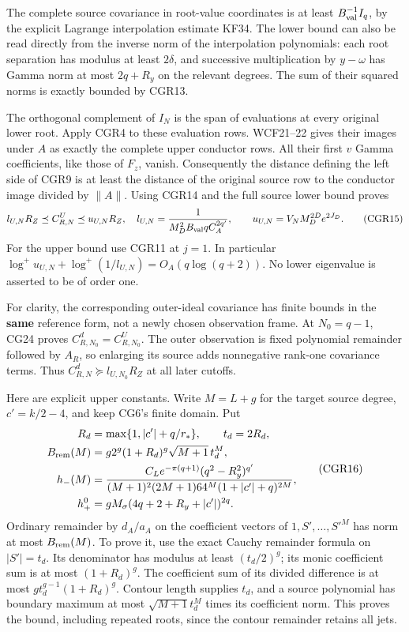 \documentclass[11pt]{article}
\begin{document}
The complete source covariance in root-value coordinates is at least \(B_{\rm val}^{-1}I_q\), by the explicit Lagrange interpolation estimate KF34. The lower bound can also be read directly from the inverse norm of the interpolation polynomials: each root separation has modulus at least \(2\delta\), and successive multiplication by \(y-\omega\) has Gamma norm at most \(2q+R_y\) on the relevant degrees. The sum of their squared norms is exactly bounded by CGR13.

The orthogonal complement of \(I_N\) is the span of evaluations at every original lower root. Apply CGR4 to these evaluation rows. WCF21--22 gives their images under \(A\) as exactly the complete upper conductor rows. All their first \(v\) Gamma coefficients, like those of \(F_z\), vanish. Consequently the distance defining the left side of CGR9 is at least the distance of the original source row to the conductor image divided by \(\|A\|\). Using CGR14 and the full source lower bound proves \[
l_{U,N}R_Z\preceq C_{R,N}^U\preceq u_{U,N}R_Z,
\quad
l_{U,N}=\frac1{M_D^2 B_{\rm val}q C_A^{2q'}},\qquad
u_{U,N}=V_N M_D^{2D}e^{2J_D}.
\tag{CGR15}
\] For the upper bound use CGR11 at \(j=1\). In particular \(\log^+u_{U,N}+\log^+(1/l_{U,N})=O_A(q\log(q+2))\). No lower eigenvalue is asserted to be of order one.

For clarity, the corresponding outer-ideal covariance has finite bounds in the \textbf{same} reference form, not a newly chosen observation frame. At \(N_0=q-1\), CG24 proves \(C_{R,N_0}^d=C_{R,N_0}^U\). The outer observation is fixed polynomial remainder followed by \(A_R\), so enlarging its source adds nonnegative rank-one covariance terms. Thus \(C_{R,N}^d\succeq l_{U,N_0}R_Z\) at all later cutoffs.

Here are explicit upper constants. Write \(M=L+g\) for the target source degree, \(c'=k/2-4\), and keep CG6's finite domain. Put \[
\begin{split}
R_d&=\max\{1,|c'|+q/r_*\},\qquad t_d=2R_d,\\
B_{\rm rem}(M)&=g2^g(1+R_d)^g\sqrt{M+1}\,t_d^M,\\
h_-(M)&=\frac{C_Le^{-\pi(q+1)}(q^2-R_y^2)^{q'}}
{(M+1)^2(2M+1)64^M(1+|c'|+q)^{2M}},\\
h_+^0&=gM_\sigma(4q+2+R_y+|c'|)^{2q}.
\end{split}\tag{CGR16}
\] Ordinary remainder by \(d_A/a_A\) on the coefficient vectors of \(1,S',\ldots,S'^M\) has norm at most \(B_{\rm rem}(M)\). To prove it, use the exact Cauchy remainder formula on \(|S'|=t_d\). Its denominator has modulus at least \((t_d/2)^g\); its monic coefficient sum is at most \((1+R_d)^g\). The coefficient sum of its divided difference is at most \(g t_d^{g-1}(1+R_d)^g\). Contour length supplies \(t_d\), and a source polynomial has boundary maximum at most \(\sqrt{M+1}t_d^M\) times its coefficient norm. This proves the bound, including repeated roots, since the contour remainder retains all jets.
\end{document}
